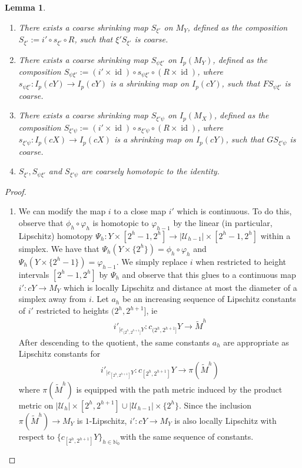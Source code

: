 \documentclass[a4paper,11pt]{article}
\theoremstyle{definition}
\theoremstyle{plain}
\newtheorem{lemma}[definition]{Lemma}
\theoremstyle{remark}
\DeclareMathOperator{\id}{id}
\begin{document}
{\begin{lemma} \begin{enumerate} \label{globallycoarse}
\item There exists a coarse shrinking map $S_{\xi'}$ on $M_{Y}$, defined as the composition $S_{\xi'}:=i' \circ s_{\xi'} \circ R$, such that $\xi' S_{\xi'}$ is coarse. 
\item There exists a coarse shrinking map $S_{\psi \xi'}$ on $I_{p}(M_{Y})$, defined as the composition $S_{\psi \xi'}:= (i' \times \id) \circ s_{\psi \xi'}  \circ (R \times \id)$, where $s_{\psi \xi'}: I_{p}(cY)\rightarrow I_{p}(cY)$ is a shrinking map on $I_{p}(cY)$, such that $F S_{\psi \xi'}$ is coarse. 
\item There exists a coarse shrinking map $S_{\xi'\psi}$ on $I_{p}(M_{X})$, defined as the composition $S_{\xi'\psi}:=(i' \times \id) \circ s_{\xi'\psi}  \circ (R \times \id)$, where $s_{\xi' \psi}: I_{p}(cX)\rightarrow I_{p}(cX)$ is a shrinking map on $I_{p}(cY)$, such that $G S_{\xi' \psi}$ is coarse. 
\item $S_{\xi'}, S_{\psi \xi'}$ and $S_{\xi'\psi}$ are coarsely homotopic to the identity. 
\end{enumerate}
\end{lemma}

\begin{proof} 
\begin{enumerate}
\item We can modify the map $i$ to a close map $i'$ which is continuous. To do this, observe that $\phi_{h}\circ \varphi_{h}$ is homotopic to $\varphi_{h-1}$ by the linear (in particular, Lipschitz) homotopy $\Psi_{h}: Y \times [2^{h}-1,2^{h}] \rightarrow |\mathcal{U}_{h-1}| \times [2^{h}-1,2^{h}]$ within a simplex. We have that $\Psi_{h} (Y\times \{2^{h}\}) = \phi_{h}\circ \varphi_{h}$ and $\Psi_{h}(Y\times \{2^{h}-1\}) = \varphi_{h-1}$. We simply replace $i$ when restricted to height intervals $[2^{h}-1,2^{h}]$ by $\Psi_{h}$ and observe that this glues to a continuous map $i': cY\rightarrow M_{Y}$ which is locally Lipschitz and distance at most the diameter of a simplex away from $i$. Let $a_{h}$ be an increasing sequence of Lipschitz constants of $i'$ restricted to heights $(2^h,2^{h+1}]$, ie
\begin{align*}
i'_{|c_{(2^h,2^{h+1}]} Y}: c_{(2^h,2^{h+1}]} Y\rightarrow \tilde{M}^h
\end{align*}
After descending to the quotient, the same constants $a_{h}$ are appropriate as Lipschitz constants for 
\begin{align*}
i'_{|c_{[2^h,2^{h+1}]} Y}: c_{[2^h,2^{h+1}]} Y\rightarrow  \pi(\tilde{M}^h)
\end{align*}
where $\pi (\tilde{M}^h)$ is equipped with the path metric induced by the product metric on $|\mathcal{U}_{h}| \times [2^h,2^{h+1}] \cup |\mathcal{U}_{h-1}| \times \{2^{h}\}$.  Since the inclusion $\pi (\tilde{M}^h)\rightarrow M_{Y}$ is $1$-Lipschitz, $i': cY\rightarrow M_{Y}$ is also locally Lipschitz with respect to $\{c_{[2^h,2^{h+1}]} Y\}_{h\in \mathbb{N}_{0}}$with the same sequence of constants.  \\


\end{enumerate}
\end{proof}}
\end{document}
